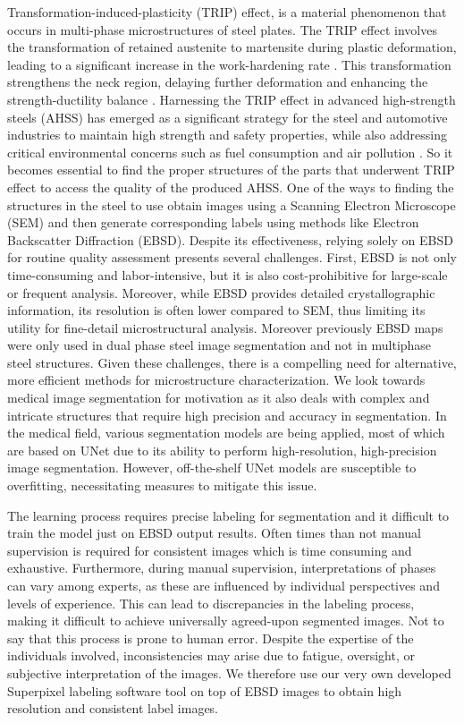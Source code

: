 \documentclass[]{article}
\begin{document}
Transformation-induced-plasticity (TRIP) effect, is a material phenomenon that occurs in multi-phase microstructures of steel plates. The TRIP effect involves the transformation of retained austenite to martensite during plastic deformation, leading to a significant increase in the work-hardening rate \cite{tripSteels}. This transformation strengthens the neck region, delaying further deformation and enhancing the strength-ductility balance \cite{ALLAIN2004158}. Harnessing the TRIP effect in advanced high-strength steels (AHSS) has emerged as a significant strategy for the steel and automotive industries to maintain high strength and safety properties, while also addressing critical environmental concerns such as fuel consumption and air pollution \cite{BOUAZIZ2011141}. So it becomes essential to find the proper structures of the parts that underwent TRIP effect to access the quality of the produced AHSS. 
One of the ways to finding the structures in the steel to use obtain images using a Scanning Electron Microscope (SEM) and then generate corresponding labels using methods like Electron Backscatter Diffraction (EBSD). Despite its effectiveness, relying solely on EBSD for routine quality assessment presents several challenges. First, EBSD is not only time-consuming and labor-intensive, but it is also cost-prohibitive for large-scale or frequent analysis. Moreover, while EBSD provides detailed crystallographic information, its resolution is often lower compared to SEM, thus limiting its utility for fine-detail microstructural analysis. Moreover previously EBSD maps were only used in dual phase steel image segmentation\cite{ebsd1, ebsd2} and not in multiphase steel structures. Given these challenges, there is a compelling need for alternative, more efficient methods for microstructure characterization. We look towards medical image segmentation for motivation as it also deals with complex and intricate structures that require high precision and accuracy in segmentation. In the medical field, various segmentation models are being applied, most of which are based on UNet due to its ability to perform high-resolution, high-precision image segmentation. However, off-the-shelf UNet models are susceptible to overfitting, necessitating measures to mitigate this issue.

The learning process requires precise labeling for segmentation and it difficult to train the model just on EBSD output results. Often times than not manual supervision is required for consistent images which is time consuming and exhaustive. Furthermore, during manual supervision, interpretations of phases can vary among experts, as these are influenced by individual perspectives and levels of experience. This can lead to discrepancies in the labeling process, making it difficult to achieve universally agreed-upon segmented images. Not to say that this process is prone to human error. Despite the expertise of the individuals involved, inconsistencies may arise due to fatigue, oversight, or subjective interpretation of the images. We therefore use our very own developed Superpixel labeling software tool on top of EBSD images to obtain high resolution and consistent label images. 
\end{document}
